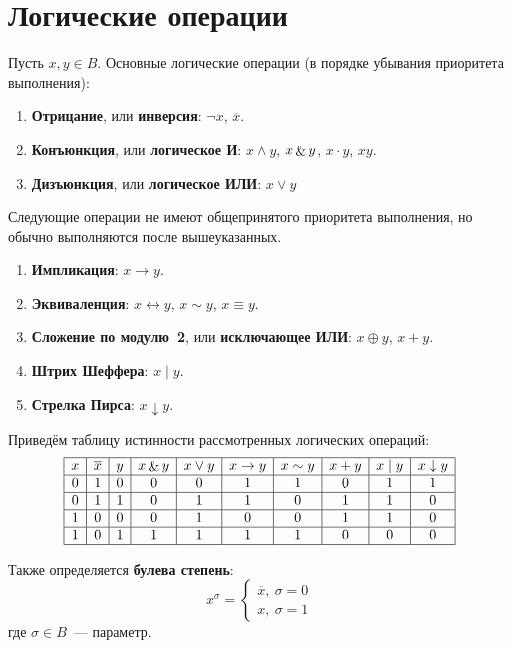 \section{Логические операции}
Пусть $x, y \in B$.
 Основные логические операции (в порядке убывания приоритета выполнения):
\begin{enumerate}
	\item {}  \textbf{Отрицание}, или \textbf{инверсия}: $\lnot x$, $\overline x$.
	\item {} \textbf{Конъюнкция}, или \textbf{логическое И}: $x \land y$, $x \mathop{\&} y$, $x \cdot y$, $xy$.
	\item {} \textbf{Дизъюнкция}, или \textbf{логическое ИЛИ}: $x \lor y$
\end{enumerate}

Следующие операции не имеют общепринятого приоритета выполнения, но обычно выполняются после вышеуказанных.
\begin{enumerate}
	\item \textbf{Импликация}: $x \rightarrow y$.
	\item \textbf{Эквиваленция}: $x \leftrightarrow y$, $x \sim y$, $x \equiv y$.
	\item \textbf{Сложение по модулю~2}, или \textbf{исключающее ИЛИ}: $x \oplus y$, $x + y$.
	\item \textbf{Штрих Шеффера}: $x \mid y$.
	\item \textbf{Стрелка Пирса}: $x \downarrow y$.
\end{enumerate}

Приведём таблицу истинности рассмотренных логических операций:
\begin{equation*}
\begin{array}{|c|c|c|c|c|c|c|c|c|c|}
\hline
x & \overline x & y & x \mathop{\&} y & x \lor y & x \rightarrow y & x \sim y & x + y & x \mid y & x \downarrow y \\
\hline
0 & 1 & 0 & 0 & 0 & 1 & 1 & 0 & 1 & 1 \\
\hline
0 & 1 & 1 & 0 & 1 & 1 & 0 & 1 & 1 & 0 \\
\hline
1 & 0 & 0 & 0 & 1 & 0 & 0 & 1 & 1 & 0 \\
\hline
1 & 0 & 1 & 1 & 1 & 1 & 1 & 0 & 0 & 0 \\
\hline
\end{array}
\end{equation*}

 Также определяется \textbf{булева степень}:
\begin{equation*}
x^\sigma =
\begin{cases}
\overline x, \ \sigma = 0 \\
x, \ \sigma = 1
\end{cases}
\end{equation*}
где $\sigma \in B$~--- параметр.